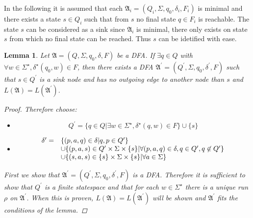 \documentclass[10pt]{article}
\theoremstyle{definition}
\theoremstyle{plain}
\newtheorem{lemma}{Lemma}
\theoremstyle{remark}
\begin{document}
  In the following it is assumed that each
  $\mathfrak{A}_i=(Q_i,\Sigma,q_0,\delta_i,F_i)$ is minimal and there
  exists a state $s\in Q_i$ such that from $s$ no final state $q\in F_i$ is
  reachable. The state $s$ can be considered as a sink since $\mathfrak{A}_i$ is
  minimal, there only exists on state $s$ from which no final state can be
  reached. Thus $s$ can be idetified with ease.

  \begin{lemma}
    Let $\mathfrak{A}=(Q,\Sigma,q_0,\delta,F)$ be a DFA. If $\exists q\in Q$
    with $\forall w\in \Sigma^\star, \delta^\star(q_0,w)\in F$, then there
    exists a DFA $\mathfrak{A}^\prime=(Q^\prime,\Sigma,q_0,\delta^\prime,F)$
    such that $s\in Q^\prime$ is a sink node and has no outgoing edge to another
    node than $s$ and $L(\mathfrak{A})=L(\mathfrak{A}^\prime)$.
    
    \begin{proof}
      Therefore choose:
      \begin{itemize}
        \item \begin{displaymath}
                Q^\prime=\{q\in Q| \exists w\in \Sigma^\star,
                  \delta^\star(q,w)\in F\}\cup \{s\}
              \end{displaymath}
        \item \begin{displaymath}
                \begin{array}{l l}
                  \delta^\prime=&\{(p,a,q)\in\delta|q,p\in Q^\prime\} \\
                    & \cup \{(p,a,s)\in Q^\prime \times \Sigma \times \{s\} | \forall
                    (p,a,q)\in \delta, q\in Q^\prime, q\not \in Q^\prime\} \\ &\cup 
                    \{(s,a,s)\in \{s\}\times\Sigma\times\{s\}|\forall a\in
                    \Sigma\}
                  \end{array}
                \end{displaymath}
      \end{itemize}
      First we show that
      $\mathfrak{A}^\prime=(Q^\prime,\Sigma,q_0,\delta^\prime,F)$ is a DFA.
      Therefore it is sufficient to show that $Q^\prime$ is a finite statespace
      and that for each $w\in \Sigma^\star$ there is a unique run $\rho$ on
      $\mathfrak{A}^\prime$. When this is proven,
      $L(\mathfrak{A})=L(\mathfrak{A}^\prime)$ will be shown and $\mathfrak{A}^\prime$ fits
      the conditions of the lemma.


\end{proof}
\end{lemma}
\end{document}
